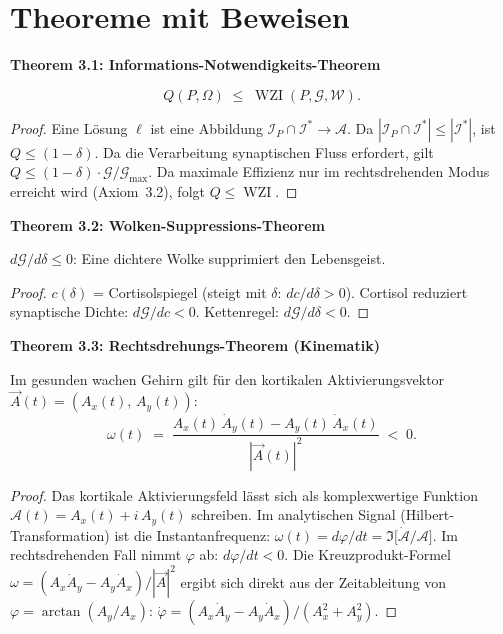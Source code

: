 ﻿\documentclass[12pt,a4paper]{report}
\theoremstyle{plain}
\theoremstyle{definition}
\theoremstyle{remark}
\DeclareMathOperator{\WZI}{WZI}
\begin{document}
	
	\section{Theoreme mit Beweisen}
	
	
	\noindent\textbf{Theorem 3.1: Informations-Notwendigkeits-Theorem}

		\[
		Q(P, \Omega) \;\leq\; \WZI(P, \mathcal{G}, \mathcal{W}).
		\]

	
	\begin{proof}
		Eine Lösung $\ell$ ist eine Abbildung $\mathcal{I}_P \cap \mathcal{I}^* \to \mathcal{A}$.
		Da $|\mathcal{I}_P \cap \mathcal{I}^*| \leq |\mathcal{I}^*|$, ist $Q \leq (1-\delta)$.
		Da die Verarbeitung synaptischen Fluss erfordert, gilt $Q \leq (1-\delta)\cdot\mathcal{G}/\mathcal{G}_{\max}$.
		Da maximale Effizienz nur im rechtsdrehenden Modus erreicht wird
		(Axiom~3.2), folgt $Q \leq \WZI$. 
	\end{proof}
	
	
	\noindent\textbf{Theorem 3.2: Wolken-Suppressions-Theorem}

		$d\mathcal{G}/d\delta \leq 0$:
		Eine dichtere Wolke supprimiert den Lebensgeist.

	
	\begin{proof}
		$c(\delta)$ = Cortisolspiegel (steigt mit $\delta$: $dc/d\delta > 0$).
		Cortisol reduziert synaptische Dichte: $d\mathcal{G}/dc < 0$.
		Kettenregel: $d\mathcal{G}/d\delta < 0$. 
	\end{proof}
	
	
	\noindent\textbf{Theorem 3.3: Rechtsdrehungs-Theorem (Kinematik)}

		\label{thm:rechts}
		Im gesunden wachen Gehirn gilt für den kortikalen Aktivierungsvektor
		$\vec{A}(t) = (A_x(t),\, A_y(t))$:
		\[
		\omega(t) \;=\;
		\frac{A_x(t)\,\dot{A}_y(t) - A_y(t)\,\dot{A}_x(t)}
		{|\vec{A}(t)|^2}
		\;<\; 0.
		\]

	
	\begin{proof}
		Das kortikale Aktivierungsfeld lässt sich als komplexwertige Funktion
		$\mathcal{A}(t) = A_x(t) + i\,A_y(t)$ schreiben.
		Im analytischen Signal (Hilbert-Transformation) ist die Instantanfrequenz:
		$\omega(t) = d\varphi/dt = \Im\bigl[\dot{\mathcal{A}} / \mathcal{A}\bigr]$.
		Im rechtsdrehenden Fall nimmt $\varphi$ ab: $d\varphi/dt < 0$.
		Die Kreuzprodukt-Formel $\omega = (A_x\dot{A}_y - A_y\dot{A}_x)/|\vec{A}|^2$
		ergibt sich direkt aus der Zeitableitung von $\varphi = \arctan(A_y/A_x)$:
		$\dot{\varphi} = (A_x\dot{A}_y - A_y\dot{A}_x)/(A_x^2+A_y^2)$. 
	\end{proof}
	
\end{document}
